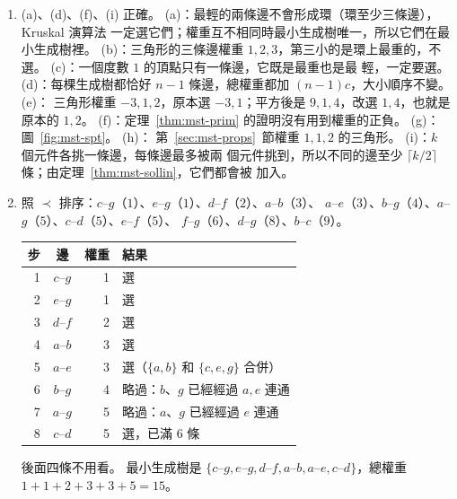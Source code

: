 \begin{enumerate}
\item (a)、(d)、(f)、(i) 正確。 (a)：最輕的兩條邊不會形成環（環至少三條邊），Kruskal 演算法
一定選它們；權重互不相同時最小生成樹唯一，所以它們在最小生成樹裡。 (b)：三角形的三條邊權重
$1, 2, 3$，第三小的是環上最重的，不選。 (c)：一個度數 $1$ 的頂點只有一條邊，它既是最重也是最
輕，一定要選。 (d)：每棵生成樹都恰好 $n - 1$ 條邊，總權重都加 $(n - 1)c$，大小順序不變。 (e)：
三角形權重 $-3, 1, 2$，原本選 $-3, 1$；平方後是 $9, 1, 4$，改選 $1, 4$，也就是原本的 $1, 2$。
(f)：定理~\ref{thm:mst-prim} 的證明沒有用到權重的正負。 (g)：圖~\ref{fig:mst-spt}。 (h)：
第~\ref{sec:mst-props}~節權重 $1, 1, 2$ 的三角形。 (i)：$k$ 個元件各挑一條邊，每條邊最多被兩
個元件挑到，所以不同的邊至少 $\lceil k/2 \rceil$ 條；由定理~\ref{thm:mst-sollin}，它們都會被
加入。

\item 照 $\prec$ 排序：$c$--$g$（$1$）、$e$--$g$（$1$）、$d$--$f$（$2$）、$a$--$b$（$3$）、
$a$--$e$（$3$）、$b$--$g$（$4$）、$a$--$g$（$5$）、$c$--$d$（$5$）、$e$--$f$（$5$）、
$f$--$g$（$6$）、$d$--$g$（$8$）、$b$--$c$（$9$）。

\begin{center}
\small
\begin{tabular}{rcrl}
\toprule
步 & 邊 & 權重 & 結果 \\
\midrule
1 & $c$--$g$ & 1 & 選 \\
2 & $e$--$g$ & 1 & 選 \\
3 & $d$--$f$ & 2 & 選 \\
4 & $a$--$b$ & 3 & 選 \\
5 & $a$--$e$ & 3 & 選（$\{a, b\}$ 和 $\{c, e, g\}$ 合併） \\
6 & $b$--$g$ & 4 & 略過：$b$、$g$ 已經經過 $a, e$ 連通 \\
7 & $a$--$g$ & 5 & 略過：$a$、$g$ 已經經過 $e$ 連通 \\
8 & $c$--$d$ & 5 & 選，已滿 $6$ 條 \\
\bottomrule
\end{tabular}
\end{center}
後面四條不用看。 最小生成樹是 $\{c\text{--}g, e\text{--}g, d\text{--}f, a\text{--}b, a\text{--}e,
c\text{--}d\}$，總權重 $1 + 1 + 2 + 3 + 3 + 5 = 15$。


\end{enumerate}
